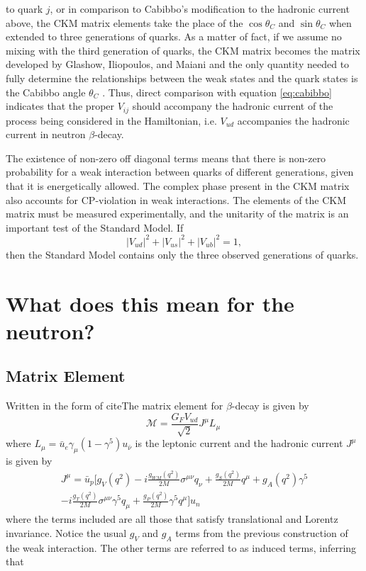 to quark $j$, or in comparison to Cabibbo's modification to the hadronic current
above, the CKM matrix elements take the place of the $\cos\theta_C$ and $\sin\theta_C$
when extended to three generations of quarks. As a matter of fact, if we assume no mixing
with the third generation of quarks, the CKM matrix becomes the matrix developed by
Glashow, Iliopoulos, and Maiani and the only quantity needed to fully determine
the relationships between the weak states and the quark states is the Cabibbo angle $\theta_C$
\cite{griffiths2008}.
Thus, direct comparison with equation \ref{eq:cabibbo} indicates that the proper
$V_{ij}$ should accompany the hadronic current
of the process being considered in the Hamiltonian, i.e. $V_{ud}$ accompanies the hadronic
current in neutron $\beta$-decay.

The existence of non-zero off diagonal terms means that there is non-zero probability for a
weak interaction between quarks of different generations, given that it is energetically
allowed. The complex phase present in the CKM
matrix also accounts for CP-violation in weak interactions.
The elements of the CKM matrix must be measured experimentally, and the unitarity of the matrix
is an important test of the Standard Model. If
%
\begin{equation}
  |V_{ud}|^2 + |V_{us}|^2 + |V_{ub}|^2 = 1,
\end{equation}
then the Standard Model contains only the three observed generations of quarks.


\section{What does this mean for the neutron?}

\subsection{Matrix Element}
Written in the form of citeThe matrix element for $\beta$-decay is given by
%
\begin{equation}
  \mathcal{M} = \frac{G_FV_{ud}}{\sqrt{2}} J^\mu L_\mu\
\end{equation}
%
where $L_\mu = \bar{u}_e \gamma_\mu (1-\gamma^5) u_{\bar{\nu}}$ is the leptonic current
and the hadronic current $J^\mu$ is given by
%
\begin{multline}
  J^\mu = \bar{u}_p \bigg[ g_V(q^2) - i \frac{g_{WM}(q^2)}{2M}\sigma^{\mu\nu}q_\nu + \frac{g_S(q^2)}{2M}q^\mu
    + g_A(q^2)\gamma^5 \\- i \frac{g_{T}(q^2)}{2M}\sigma^{\mu\nu}\gamma^5q_\mu 
    +  \frac{g_P(q^2)}{2M}\gamma^5q^\mu \bigg] u_n
\end{multline}
%
where the terms included are all those that satisfy translational and Lorentz invariance. Notice the
usual $g_V$ and $g_A$ terms from the previous construction of the weak interaction. The other terms
are referred to as induced terms, inferring that 
